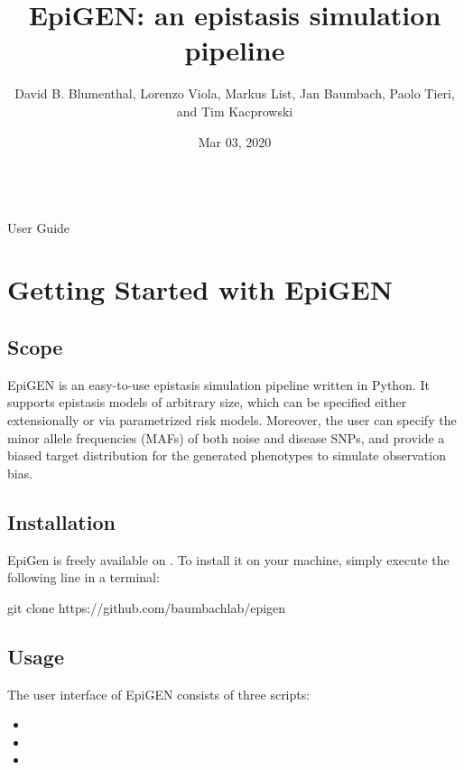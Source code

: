\documentclass[a4paper,10pt,english]{sphinxhowto}
\title{EpiGEN: an epistasis simulation pipeline}
\date{Mar 03, 2020}
\author{David B. Blumenthal, Lorenzo Viola, Markus List, Jan Baumbach, Paolo Tieri, and Tim Kacprowski}
\begin{document}
\pagestyle{empty}
\makeatletter\py@HeaderFamily\raggedright{\huge\@title}\\[24pt]{\Large User Guide}\\[24pt]{\large\@author}\makeatother\normalfont
\pagestyle{plain}
\sphinxtableofcontents
\pagestyle{normal}
\label{\detokenize{index::doc}}



\section{Getting Started with EpiGEN}
\label{\detokenize{README:getting-started-with-epigen}}\label{\detokenize{README::doc}}

\subsection{Scope}
\label{\detokenize{README:scope}}
EpiGEN is an easy-to-use epistasis simulation pipeline written in Python. It supports epistasis models of arbitrary size, which can be specified either extensionally or via parametrized risk models. Moreover, the user can specify the minor allele frequencies (MAFs) of both noise and disease SNPs, and provide a biased target distribution for the generated phenotypes to simulate observation bias.


\subsection{Installation}
\label{\detokenize{README:installation}}
EpiGen is freely available on . To install it on your machine, simply execute the following line in a terminal:

\begin{sphinxVerbatim}[commandchars=\\\{\}]
git clone https://github.com/baumbachlab/epigen
\end{sphinxVerbatim}


\subsection{Usage}
\label{\detokenize{README:usage}}
The user interface of EpiGEN consists of three scripts:
\begin{itemize}
\item {} 

\item {} 

\item {} 

\end{itemize}
\end{document}
